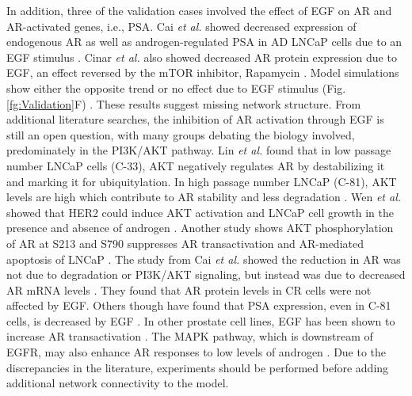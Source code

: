 \documentclass[12pt]{article}
\begin{document}
In addition, three of the validation cases involved the effect of EGF on AR and AR-activated genes, i.e., PSA. 
Cai \textit{et al.} showed decreased expression of endogenous AR as well as androgen-regulated PSA in AD LNCaP cells due to an EGF stimulus \cite{Cai2009}. 
Cinar \textit{et al.} also showed decreased AR protein expression due to EGF, an effect reversed by the mTOR inhibitor, Rapamycin \cite{Cinar2005}. 
Model simulations show either the opposite trend or no effect due to EGF stimulus (Fig. \ref{fg:Validation}F) \cite{Cinar2005}. 
These results suggest missing network structure. 
From additional literature searches, the inhibition of AR activation through EGF is still an open question, with many groups debating the biology involved, predominately in the PI3K/AKT pathway. 
Lin \textit{et al.} found that in low passage number LNCaP cells (C-33), AKT negatively regulates AR by destabilizing it and marking it for ubiquitylation. 
In high passage number LNCaP (C-81), AKT levels are high which contribute to AR stability and less degradation \cite{Lin2003}. 
Wen \textit{et al.} showed that HER2 could induce AKT activation and LNCaP cell growth in the presence and absence of androgen \cite{Wen2000}. 
Another study shows AKT phosphorylation of AR at S213 and S790 suppresses AR transactivation and AR-mediated apoptosis of LNCaP \cite{Lin2001PNAS}. 
The study from Cai \textit{et al.} showed the reduction in AR was not due to degradation or PI3K/AKT signaling, but instead was due to decreased AR mRNA levels \cite{Cai2009}. 
They found that AR protein levels in CR cells were not affected by EGF. 
Others though have found that PSA expression, even in C-81 cells, is decreased by EGF \cite{Hakariya2006}. 
In other prostate cell lines, EGF has been shown to increase AR transactivation \cite{Gregory2004,Ponguta2008}. 
The MAPK pathway, which is downstream of EGFR, may also enhance AR responses to low levels of androgen \cite{Guo2006,Weber2004}. 
Due to the discrepancies in the literature, experiments should be performed before adding additional network connectivity to the model.
\end{document}
